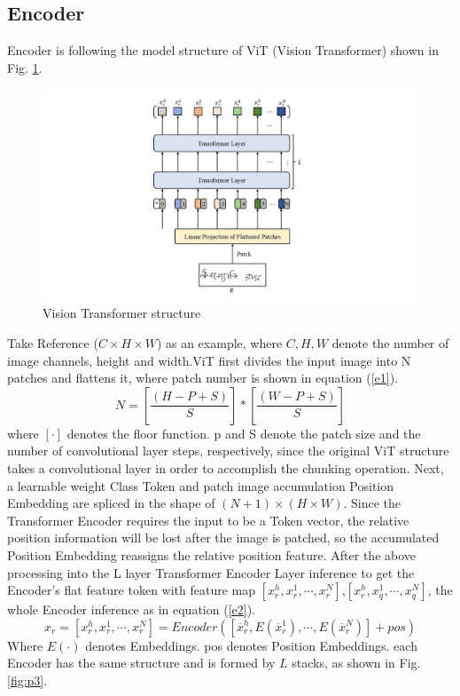 \documentclass{article}
\begin{document}
\subsection{Encoder}

Encoder is following the model structure of ViT (Vision Transformer) \cite{10} shown in Fig. \ref{fig:p2}.

\begin{figure}[htbp]
	\centering
	\includegraphics[scale=0.45]{figure/p2.jpg}
	\caption{Vision Transformer structure}\label{fig:p2}
\end{figure}

Take Reference ($C\times H\times W$) as an example, where $C,H,W$ denote the number of image channels, height and width.ViT first divides the input image into N patches and flattens it, where patch number is shown in equation (\ref{e1}).
\begin{equation}\label{e1}
	N = [\frac{(H-P+S)}{S}]*[\frac{(W-P+S)}{S}]
\end{equation}
where $[\cdot]$ denotes the floor function. p and S denote the patch size and the number of convolutional layer steps, respectively, since the original ViT structure takes a convolutional layer in order to accomplish the chunking operation. Next, a learnable weight Class Token and patch image accumulation Position Embedding are spliced in the shape of $(N+1)\times(H\times W)$. Since the Transformer Encoder requires the input to be a Token vector, the relative position information will be lost after the image is patched, so the accumulated Position Embedding reassigns the relative position feature. After the above processing into the L layer Transformer Encoder Layer inference to get the Encoder's flat feature token with feature map $[x_r^h,x_r^1,\cdots,x_r^N ]$,$[x_r^h,x_q^1 ,\cdots,x_q^N]$, the whole Encoder inference as in equation (\ref{e2}).
\begin{equation}\label{e2}
	x_r=[x_r^h,x_r^1,\cdots,x_r^N ]=Encoder([\overline{x}_r^h,E(\overline{x}_r^1),\cdots,E(\overline{x}_r^N )]+pos)
\end{equation}
Where $E(\cdot)$ denotes Embeddings. pos denotes Position Embeddings. each Encoder has the same structure and is formed by $L$ stacks, as shown in Fig. \ref{fig:p3}.
\end{document}
